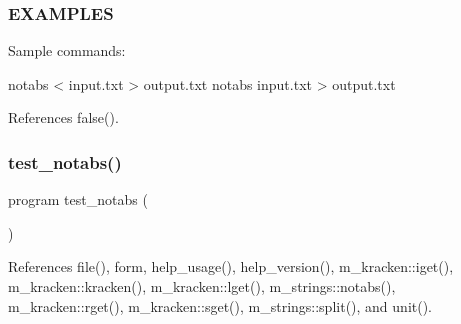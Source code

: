 \subsubsection*{E\+X\+A\+M\+P\+L\+ES}

\begin{DoxyVerb}    Sample commands:

     notabs < input.txt > output.txt
     notabs input.txt   > output.txt \end{DoxyVerb}
 

References false().

\mbox{\label{notabs_8f90_acb31f04c67c279d1a77f3346ad0cf516}} 
\subsubsection{\texorpdfstring{test\+\_\+notabs()}{test\_notabs()}}
{\footnotesize\ttfamily program test\+\_\+notabs (\begin{DoxyParamCaption}{ }\end{DoxyParamCaption})}



References file(), form, help\+\_\+usage(), help\+\_\+version(), m\+\_\+kracken\+::iget(), m\+\_\+kracken\+::kracken(), m\+\_\+kracken\+::lget(), m\+\_\+strings\+::notabs(), m\+\_\+kracken\+::rget(), m\+\_\+kracken\+::sget(), m\+\_\+strings\+::split(), and unit().

